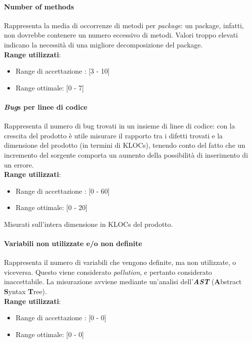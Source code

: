 \paragraph{Number of methods}
Rappresenta la media di occorrenze di metodi per \textit{package}: un package, infatti, non dovrebbe contenere un numero eccessivo di metodi. Valori troppo elevati indicano la necessit\`a di una migliore decomposizione del package. \\
\textbf{Range utilizzati}:
\begin{itemize}
	\item Range di accettazione : [3 - 10]
	\item Range ottimale: [0 - 7]
\end{itemize}

\paragraph{\textit{Bug}s per linee di codice}
Rappresenta il numero di bug trovati in un insieme di linee di codice: con la crescita del prodotto \`e utile misurare il rapporto tra i difetti trovati e la dimensione del prodotto (in termini di KLOCs), tenendo conto del fatto che un incremento del sorgente comporta un aumento della possibilit\`a di inserimento di un errore. \\
\textbf{Range utilizzati}:
\begin{itemize}
	\item Range di accettazione : [0 - 60]
	\item Range ottimale: [0 - 20]
\end{itemize}
Misurati sull'intera dimensione in KLOCs del prodotto.

\paragraph{Variabili non utilizzate e/o non definite}
Rappresenta il numero di variabili che vengono definite, ma non utilizzate, o viceversa. Questo viene considerato \textit{pollution}, e pertanto considerato inaccettabile. La misurazione avviene mediante un'analisi dell'\textbf{\textit{AST}} (\textbf{A}bstract \textbf{S}yntax \textbf{T}ree). \\
\textbf{Range utilizzati}:
\begin{itemize}
	\item Range di accettazione : [0 - 0]
	\item Range ottimale: [0 - 0]
\end{itemize}


